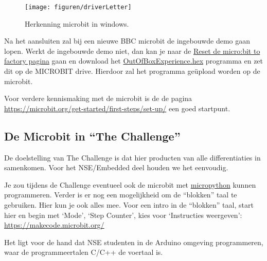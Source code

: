 \begin{figure}[h!]
	\captionsetup{justification=centering}
	\texttt{[image: figuren/driverLetter]}
	\centering
	\caption{Herkenning microbit in windows.}
	\label{fig:driveL}
\end{figure}

Na het aansluiten zal bij een nieuwe BBC microbit de ingebouwde demo gaan lopen. Werkt de ingebouwde demo niet, dan kan je naar de \href{https://support.microbit.org/support/solutions/articles/19000021613-reset-the-micro-bit-to-factory-defaults}{Reset de micro:bit to factory pagina} gaan en download het  
\href{https://cdn.sanity.io/files/ajwvhvgo/production/89164d8dc63bcd7189b1bed79558c19833ec555a.hex?dl=Out%20of%20box%20experience.hex}
 {OutOfBoxExperience.hex} programma en zet dit op de MICROBIT drive. Hierdoor zal het programma geüpload worden op de microbit.

Voor verdere kennismaking met de microbit is de de pagina \href{https://microbit.org/get-started/first-steps/set-up/}{https://microbit.org/get-started/first-steps/set-up/}
een goed startpunt.


\subsection{De Microbit in “The Challenge”}

De doelstelling van The Challenge is dat hier producten van alle differentiaties in samenkomen. Voor het NSE/Embedded deel houden we het eenvoudig.


Je zou tijdens de Challenge eventueel ook de microbit met \href{https://docs.arduino.cc/micropython/?_gl=1*bbja8p*_gcl_au*MTA0MzMyMzUwNC4xNzI4NDYwNDQ0*FPAU*MTA0MzMyMzUwNC4xNzI4NDYwNDQ0*_ga*MTM2NDc5NzM2OC4xNzI4NDYwNDQy*_ga_NEXN8H46L5*MTcyODQ2MDQ0MS4xLjEuMTcyODQ2MDQ5MS4wLjAuMTk3NzAxMDU1NQ..*_fplc*dmdpUTJCaSUyQjFINjd2SExxV092Zml5Ym92VlZQMGdtNWFSeG0lMkJLWEpQSnFDMkE4cG52M1klMkJGcGdNYzRKNGhBTkMzRXcyOXc0Ykhvcndmc0UyMVdwM1U2Rzc0bkFURWoxRHBWN3RlbjNvMlRNOVJ0eW1nSmp3OXFucURhWW9BJTNEJTNE}{micropython} kunnen programmeren.
Verder is er nog een mogelijkheid om de “blokken” taal te gebruiken. Hier kun je ook alles mee.
Voor een intro in de “blokken” taal, start hier en begin met ‘Mode’, ‘Step Counter’, kies voor ‘Instructies weergeven’: \href{https://makecode.microbit.org/}{https://makecode.microbit.org/}

Het ligt voor de hand dat NSE studenten in de Arduino omgeving programmeren, waar de programmeertalen C/C++ de voertaal is.\\